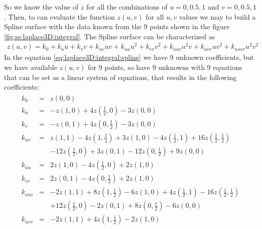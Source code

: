 %
So we know the value of $z$ for all the combinations of $u = 0,0.5,1$ and
$v = 0,0.5,1$. Then, to can evaluate the function $z(u,v)$ for all $u,v$
values we may to build a Spline surface with the data known from the 9
points shown in the figure \ref{fig:ss:laplace3D:integral}. The Spline
surface can be characterized as
%
\begin{eqnarray}
	\label{eq:laplace3D:integral:spline}
	z(u,v) = k_0 + k_u u + k_v v + k_{uv} u v + k_{uu} u^2 + k_{vv} v^2
	+ k_{uuv} u^2 v + k_{uvv} u v^2 + k_{uuvv} u^2 v^2
\end{eqnarray}
%
In the equation \ref{eq:laplace3D:integral:spline} we have 9 unknown
coefficients, but we have available $z(u,v)$ for 9 points, so have 9
unknowns with 9 equations that can be set as a linear system of
equations, that results in the following coefficients:
%
\begin{eqnarray}
	\label{eq:laplace3D:integral:k}
	\begin{array}{lcl}
	k_0 & = & z \left( 0,0 \right)
	\\
	k_u & = & - z \left( 1,0 \right) + 4 z \left( \frac{1}{2},0 \right) - 3 z \left( 0,0 \right)
	\\
	k_v & = & - z \left( 0,1 \right) + 4 z \left( 0,\frac{1}{2} \right) - 3 z \left( 0,0 \right)
	\\
	k_{uv} & = & z \left( 1,1 \right) - 4 z \left( 1,\frac{1}{2} \right) + 3 z \left( 1,0 \right)
	             - 4 z \left( \frac{1}{2},1 \right) + 16 z \left( \frac{1}{2},\frac{1}{2} \right)
	        \\ & & 
	             - 12 z \left( \frac{1}{2},0 \right) + 3 z \left( 0,1 \right)
	             - 12 z \left( 0,\frac{1}{2} \right) + 9 z \left( 0,0 \right)
	\\
	k_{uu} & = & 2 z \left( 1,0 \right) - 4 z \left( \frac{1}{2},0 \right) + 2 z \left( 1,0 \right)
	\\
	k_{vv} & = & 2 z \left( 0,1 \right) - 4 z \left( 0,\frac{1}{2} \right) + 2 z \left( 1,0 \right)
	\\
	k_{uuv} & = & - 2 z \left( 1,1 \right) + 8 z \left( 1,\frac{1}{2} \right) - 6 z \left( 1,0 \right)
	              + 4 z \left( \frac{1}{2},1 \right) - 16 z \left( \frac{1}{2},\frac{1}{2} \right)
	        \\ & & 
	              + 12 z \left( \frac{1}{2},0 \right) - 2 z \left( 0,1 \right)
	              + 8 z \left( 0,\frac{1}{2} \right) - 6 z \left( 0,0 \right)
	\\
	k_{uvv} & = & - 2 z \left( 1,1 \right) + 4 z \left( 1,\frac{1}{2} \right) - 2 z \left( 1,0 \right)

\end{array}
\end{eqnarray}
